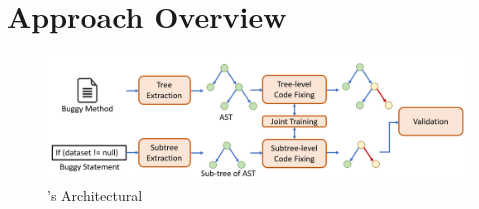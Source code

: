 \section{Approach Overview}

\begin{figure}[t]
	\centering
	\includegraphics[width=6.2in]{graphs/overview.png}
	\caption{\tool's Architectural}
	\label{overview}
\end{figure}